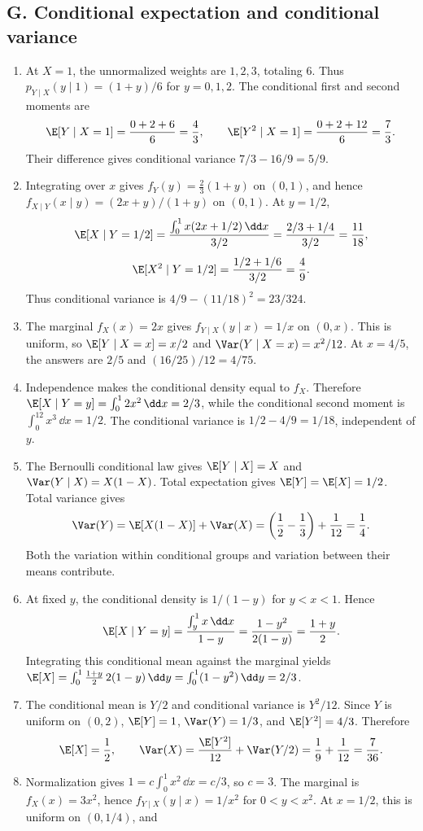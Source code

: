 \subsection{G. Conditional expectation and conditional variance}
\begin{enumerate}[label=\textbf{G\arabic*.},leftmargin=*,itemsep=1em]
\item At $X=1$, the unnormalized weights are $1,2,3$, totaling $6$. Thus $p_{Y\mid X}(y\mid1)=(1+y)/6$ for $y=0,1,2$. The conditional first and second moments are
\[
\E[Y\mid X=1]=\frac{0+2+6}{6}=\frac43,\qquad
\E[Y^2\mid X=1]=\frac{0+2+12}{6}=\frac73.
\]
Their difference gives conditional variance $7/3-16/9=5/9$.
\item Integrating over $x$ gives $f_Y(y)=\tfrac23(1+y)$ on $(0,1)$, and hence $f_{X\mid Y}(x\mid y)=(2x+y)/(1+y)$ on $(0,1)$. At $y=1/2$,
\[
\E[X\mid Y=1/2]=\frac{\int_0^1x(2x+1/2)\,\dd x}{3/2}
=\frac{2/3+1/4}{3/2}=\frac{11}{18},
\]
\[
\E[X^2\mid Y=1/2]=\frac{1/2+1/6}{3/2}=\frac49.
\]
Thus conditional variance is $4/9-(11/18)^2=23/324$.
\item The marginal $f_X(x)=2x$ gives $f_{Y\mid X}(y\mid x)=1/x$ on $(0,x)$. This is uniform, so $\E[Y\mid X=x]=x/2$ and $\Var(Y\mid X=x)=x^2/12$. At $x=4/5$, the answers are $2/5$ and $(16/25)/12=4/75$.
\item Independence makes the conditional density equal to $f_X$. Therefore $\E[X\mid Y=y]=\int_0^12x^2\,\dd x=2/3$, while the conditional second moment is $\int_0^12x^3\,\dd x=1/2$. The conditional variance is $1/2-4/9=1/18$, independent of $y$.
\item The Bernoulli conditional law gives $\E[Y\mid X]=X$ and $\Var(Y\mid X)=X(1-X)$. Total expectation gives $\E[Y]=\E[X]=1/2$. Total variance gives
\[
\Var(Y)=\E[X(1-X)]+\Var(X)
=\left(\frac12-\frac13\right)+\frac1{12}=\frac14.
\]
Both the variation within conditional groups and variation between their means contribute.
\item At fixed $y$, the conditional density is $1/(1-y)$ for $y<x<1$. Hence
\[
\E[X\mid Y=y]=\frac{\int_y^1x\,\dd x}{1-y}
=\frac{1-y^2}{2(1-y)}=\frac{1+y}{2}.
\]
Integrating this conditional mean against the marginal yields $\E[X]=\int_0^1\frac{1+y}{2}\,2(1-y)\,\dd y=\int_0^1(1-y^2)\,\dd y=2/3$.
\item The conditional mean is $Y/2$ and conditional variance is $Y^2/12$. Since $Y$ is uniform on $(0,2)$, $\E[Y]=1$, $\Var(Y)=1/3$, and $\E[Y^2]=4/3$. Therefore
\[
\E[X]=\frac12,\qquad
\Var(X)=\frac{\E[Y^2]}{12}+\Var(Y/2)
=\frac19+\frac1{12}=\frac7{36}.
\]
\item Normalization gives $1=c\int_0^1x^2\,\dd x=c/3$, so $c=3$. The marginal is $f_X(x)=3x^2$, hence $f_{Y\mid X}(y\mid x)=1/x^2$ for $0<y<x^2$. At $x=1/2$, this is uniform on $(0,1/4)$, and

\end{enumerate}
